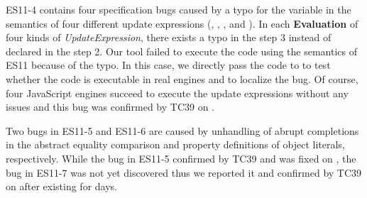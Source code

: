 ES11-4 contains four specification bugs caused by a typo for the variable in the
semantics of four different update expressions (, ,
, and ).  In each \textbf{Evaluation} of four kinds of
\textit{UpdateExpression}, there exists a typo  in the step 3
instead of  declared in the step 2.  Our tool failed to execute
the code  using the semantics of ES11 because of the typo.  In this
case, we directly pass the code to  to test whether the
code is executable in real engines and to localize the bug.  Of course, four
JavaScript engines succeed to execute the update expressions without any issues
and this bug was confirmed by TC39 on \inred{-}.

Two bugs in ES11-5 and ES11-6 are caused by unhandling of abrupt completions in
the abstract equality comparison and property definitions of object literals,
respectively.  While the bug in ES11-5 confirmed by TC39 and was fixed on
\inred{-}, the bug in ES11-7 was not yet discovered thus we reported it and
confirmed by TC39 on \inred{-} after existing for \inred{-} days.
